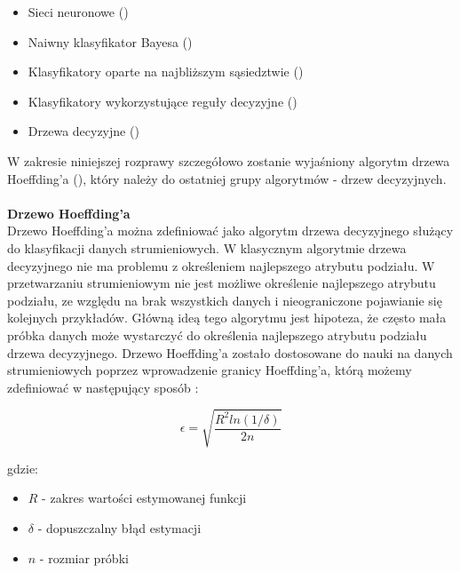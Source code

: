 \begin{itemize}
    \item Sieci neuronowe () \cite{Article:NeuralNetworks}
    \item Naiwny klasyfikator Bayesa () \cite{Article:NaiveBayes}
    \item Klasyfikatory oparte na najbliższym sąsiedztwie () \cite{Article:Neighbours}
    \item Klasyfikatory wykorzystujące reguły decyzyjne () \cite{Article:DecisionRules}
    \item Drzewa decyzyjne ()
\end{itemize}

\noindent W zakresie niniejszej rozprawy szczegółowo zostanie wyjaśniony algorytm drzewa Hoeffding'a (), który należy do ostatniej grupy algorytmów - drzew decyzyjnych.\\\\
\textbf{Drzewo Hoeffding'a}\\

\noindent Drzewo Hoeffding'a można zdefiniować jako algorytm drzewa decyzyjnego służący do klasyfikacji danych strumieniowych. W klasycznym algorytmie drzewa decyzyjnego nie ma problemu z określeniem najlepszego atrybutu podziału. W przetwarzaniu strumieniowym nie jest możliwe określenie najlepszego atrybutu podziału, ze względu na brak wszystkich danych i nieograniczone pojawianie się kolejnych przykładów. Główną ideą tego algorytmu jest hipoteza, że często mała próbka danych może wystarczyć do określenia najlepszego atrybutu podziału drzewa decyzyjnego. Drzewo Hoeffding'a zostało dostosowane do nauki na danych strumieniowych poprzez wprowadzenie granicy Hoeffding'a, którą możemy zdefiniować w następujący sposób \cite{BrzezPhd2015}:

\begin{equation}
    \epsilon = \sqrt{\frac{R^2ln(1/\delta)}{2n}}
\end{equation}

\noindent gdzie:

\begin{itemize}
    \item $R$ - zakres wartości estymowanej funkcji
    \item $\delta$ - dopuszczalny błąd estymacji
    \item $n$ - rozmiar próbki
\end{itemize}

